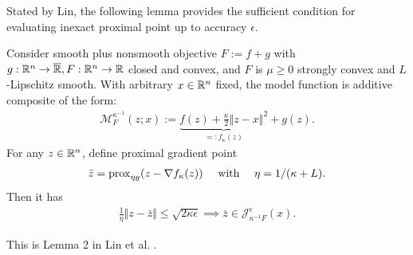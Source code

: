\documentclass[12pt]{article}
\begin{document}
        Stated by Lin, the following lemma provides the sufficient condition for evaluating inexact proximal point up to accuracy $\epsilon$. 
        \begin{lemma}\label{lemma:sufficient-c1}
            Consider smooth plus nonsmooth objective $F := f + g$ with $g:\mathbb R^n \rightarrow \overline {\mathbb R}, F:\mathbb R^n \rightarrow \mathbb R$ closed and convex, and $F$ is $\mu\ge 0$ strongly convex and $L$-Lipschitz smooth. 
            With arbitrary $x \in \mathbb R^n$ fixed, the model function is additive composite of the form: 
            \begin{align*}
                \mathcal M_F^{\kappa^{-1}}(z; x) := 
                \underbrace{f(z) + \frac{\kappa}{2}\Vert z - x\Vert^2}_{=: f_\kappa (z)}
                 + g(z). 
            \end{align*}
            For any $z \in \mathbb R^n$, define proximal gradient point 
            \begin{align*}
                \bar z = \operatorname{prox}_{\eta g}(z - \nabla f_\kappa(z)) 
                \quad 
                \text{ with } \quad  \eta = 1/(\kappa + L). 
            \end{align*}
            Then it has 
            \begin{align*}
                \frac{1}{\eta}\Vert z - \bar z\Vert
                \le \sqrt{2\kappa \epsilon} \implies 
                \bar z \in \mathcal 
                J_{\kappa^{-1}F}^\epsilon (x).
            \end{align*}
        \end{lemma}
        \begin{remark}
            This is Lemma 2 in Lin et al. \cite{lin_catalyst_2018}. 
        \end{remark}
\end{document}
